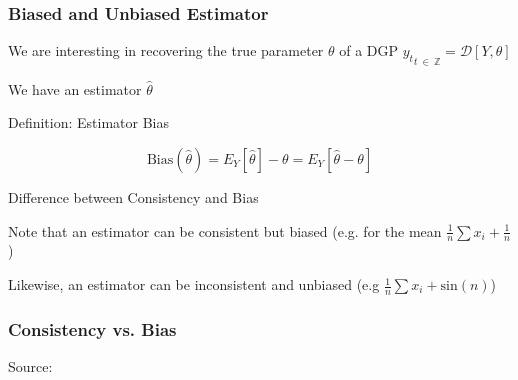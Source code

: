 \documentclass{beamer}
\newenvironment{wideitemize}{\itemize\addtolength{\itemsep}{10pt}}{\enditemize}
\begin{document}
  
  \begin{frame}
    \frametitle{Biased and Unbiased Estimator}

      \begin{wideitemize}
        \item We are interesting in recovering the true parameter $\theta$ of a DGP ${y_t}_{t \ \in \ \mathbb{Z}} = \mathcal{D}[Y, \theta]$ 
        \item We have an estimator $\hat{\theta}$
      \end{wideitemize}

      \begin{alertblock}{Definition: Estimator Bias}
        
        \begin{equation*}
          \text{Bias}(\hat{\theta}) = E_Y[\hat{\theta}] - \theta = E_Y[\hat{\theta} - \theta]
        \end{equation*}        
    \end{alertblock}

    \begin{block}{Difference between Consistency and Bias}
    \begin{wideitemize}
      \item Note that an estimator can be consistent but biased (e.g. for the mean $\frac{1}{n}\sum x_i + \frac{1}{n}$)
      \item Likewise, an estimator can be inconsistent and unbiased (e.g $\frac{1}{n}\sum x_i + \text{sin}(n)$)
    \end{wideitemize}
      
    \end{block}
    
    
  \end{frame}


  \begin{frame}
    \frametitle{Consistency vs. Bias}
    \hspace*{15pt}\hbox{\scriptsize Source:}    
  \end{frame}
  
\end{document}
